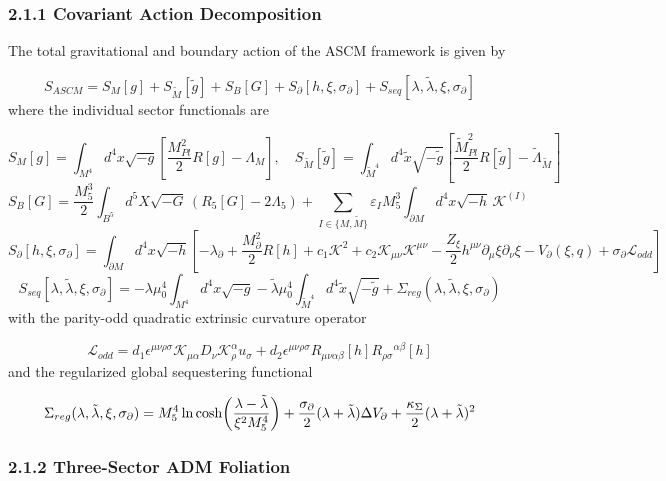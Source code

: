 \documentclass[aps,prd,onecolumn,superscriptaddress,nofootinbib,longbibliography,10pt]{revtex4-2}
\begin{document}
{{  
\subsubsection*{2.1.1 Covariant Action Decomposition}

  The total gravitational and boundary action of the ASCM framework is given by


  \[ S_{ASCM} = S_M[g] + S_{\tilde{M}}[\tilde{g}] + S_B[G] + S_\partial[h,\xi,\sigma_\partial] + S_{seq}[\lambda,\tilde{\lambda},\xi,\sigma_\partial] \]
  where the individual sector functionals are


  \[ S_M[g] = \int_{M^4} d^4x\sqrt{-g}\left[ \frac{M_{Pl}^2}{2}R[g] - \Lambda_M \right], \quad S_{\tilde{M}}[\tilde{g}] = \int_{\tilde{M}^4} d^4\tilde{x}\sqrt{-\tilde{g}}\left[ \frac{\tilde{M}_{Pl}^2}{2}R[\tilde{g}] - \tilde{\Lambda}_{\tilde{M}} \right] \]
  \[ S_B[G] = \frac{M_5^3}{2}\int_{B^5} d^5X\sqrt{-G}\,(R_5[G] - 2\Lambda_5) + \sum_{I\in\{M,\tilde{M}\}} \varepsilon_I M_5^3 \int_{\partial M} d^4x\sqrt{-h}\,\mathcal{K}^{(I)} \]
  \[ S_\partial[h,\xi,\sigma_\partial] = \int_{\partial M} d^4x\sqrt{-h}\left[ -\lambda_\partial + \frac{M_\partial^2}{2}R[h] + c_1\mathcal{K}^2 + c_2\mathcal{K}_{\mu\nu}\mathcal{K}^{\mu\nu} - \frac{Z_\xi}{2}h^{\mu\nu}\partial_\mu\xi\partial_\nu\xi - V_\partial(\xi,q) + \sigma_\partial\mathcal{L}_{odd} \right] \]
  \[ S_{seq}[\lambda,\tilde{\lambda},\xi,\sigma_\partial] = -\lambda\mu_0^4 \int_{M^4} d^4x\sqrt{-g} - \tilde{\lambda}\mu_0^4 \int_{\tilde{M}^4} d^4\tilde{x}\sqrt{-\tilde{g}} + \Sigma_{reg}(\lambda,\tilde{\lambda},\xi,\sigma_\partial) \]
  with the parity-odd quadratic extrinsic curvature operator


  \[ \mathcal{L}_{odd} = d_1\epsilon^{\mu\nu\rho\sigma}\mathcal{K}_{\mu\alpha}D_\nu\mathcal{K}^\alpha_\rho u_\sigma + d_2\epsilon^{\mu\nu\rho\sigma}R_{\mu\nu\alpha\beta}[h]R_{\rho\sigma}{}^{\alpha\beta}[h] \]
  and the regularized global sequestering functional


  \[ \Sigma_{reg}(\lambda, \tilde{\lambda}, \xi, \sigma_{\partial}) = M_5^4 \ln\cosh\!\left( \displaystyle\displaystyle\frac{\lambda - \tilde{\lambda}}{\xi^2 M_5^4}\right) + \frac{\sigma_\partial}{2}(\lambda + \tilde{\lambda})\Delta V_\partial + \frac{\kappa_\Sigma}{2}(\lambda + \tilde{\lambda})^2 \]

  
\subsubsection*{2.1.2 Three-Sector ADM Foliation}

}}
\end{document}

